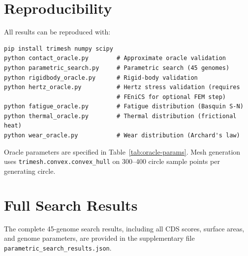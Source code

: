 \documentclass[11pt,a4paper]{article}
\begin{document}

\appendix
\section{Reproducibility}

All results can be reproduced with:

\begin{verbatim}
pip install trimesh numpy scipy
python contact_oracle.py        # Approximate oracle validation
python parametric_search.py     # Parametric search (45 genomes)
python rigidbody_oracle.py      # Rigid-body validation
python hertz_oracle.py          # Hertz stress validation (requires
                                # FEniCS for optional FEM step)
python fatigue_oracle.py        # Fatigue distribution (Basquin S-N)
python thermal_oracle.py        # Thermal distribution (frictional heat)
python wear_oracle.py           # Wear distribution (Archard's law)
\end{verbatim}

\noindent Oracle parameters are specified in Table~\ref{tab:oracle-params}.
Mesh generation uses \texttt{trimesh.convex.convex\_hull} on 300--400
circle sample points per generating circle.

\section{Full Search Results}

The complete 45-genome search results, including all CDS scores,
surface areas, and genome parameters, are provided in the supplementary
file \texttt{parametric\_search\_results.json}.

\end{document}
